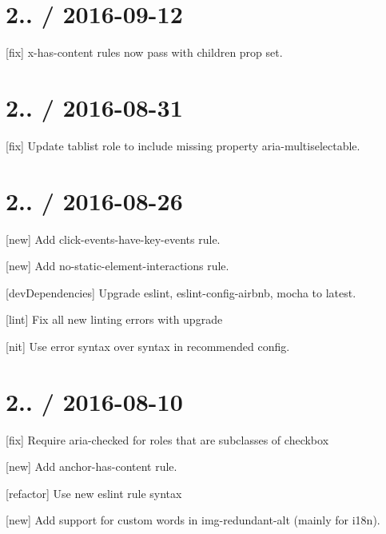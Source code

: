 \section*{2.. / 2016-\/09-\/12 }


\begin{DoxyItemize}
\item \mbox{[}fix\mbox{]} {\ttfamily x-\/has-\/content} rules now pass with children prop set.
\end{DoxyItemize}

\section*{2.. / 2016-\/08-\/31 }


\begin{DoxyItemize}
\item \mbox{[}fix\mbox{]} Update {\ttfamily tablist} role to include missing property {\ttfamily aria-\/multiselectable}.
\end{DoxyItemize}

\section*{2.. / 2016-\/08-\/26 }


\begin{DoxyItemize}
\item \mbox{[}new\mbox{]} Add {\ttfamily click-\/events-\/have-\/key-\/events} rule.
\item \mbox{[}new\mbox{]} Add {\ttfamily no-\/static-\/element-\/interactions} rule.
\item \mbox{[}dev\+Dependencies\mbox{]} Upgrade {\ttfamily eslint}, {\ttfamily eslint-\/config-\/airbnb}, {\ttfamily mocha} to latest.
\item \mbox{[}lint\mbox{]} Fix all new linting errors with upgrade
\item \mbox{[}nit\mbox{]} Use {\ttfamily error} syntax over {} syntax in recommended config.
\end{DoxyItemize}

\section*{2.. / 2016-\/08-\/10 }


\begin{DoxyItemize}
\item \mbox{[}fix\mbox{]} Require {\ttfamily aria-\/checked} for roles that are subclasses of {\ttfamily checkbox}
\item \mbox{[}new\mbox{]} Add {\ttfamily anchor-\/has-\/content} rule.
\item \mbox{[}refactor\mbox{]} Use new eslint rule syntax
\item \mbox{[}new\mbox{]} Add support for custom words in {\ttfamily img-\/redundant-\/alt} (mainly for i18n).
\end{DoxyItemize}

